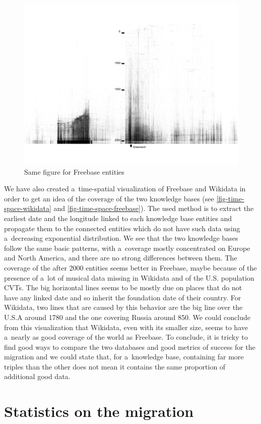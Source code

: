 \documentclass{sig-alternate}
\begin{document}
\begin{figure}
\centering
\includegraphics[width=8.45 cm]{img/freebase-time-space.png}
\caption{Same figure for Freebase entities}
\label{fig-time-space-freebase}
\end{figure}

We have also created a~time-spatial visualization of Freebase and Wikidata in order
to get an idea of the coverage of the two knowledge bases
(see \autoref{fig-time-space-wikidata} and \autoref{fig-time-space-freebase}).
The used method is to extract the earliest date and the longitude
linked to each knowledge base entities
and propagate them to the connected entities which do not have such data
using a~decreasing exponential distribution.
We see that the two knowledge bases follow the same basic patterns,
with a~coverage mostly concentrated on Europe and North America,
and there are no strong differences between them.
The coverage of the after 2000 entities seems better in Freebase, maybe because of
the presence of a~lot of musical data missing in Wikidata and of the U.S.
population CVTs.
The big horizontal lines seems to be mostly due on places that do not have any linked date
and so inherit the foundation date of their country.
For Wikidata, two lines that are caused by this behavior are the big line over the U.S.A around 1780
and the one covering Russia around 850.
We could conclude from this visualization that Wikidata, even with its smaller size,
seems to have a~nearly as good coverage of the world as Freebase.
To conclude, it is tricky to find good ways to compare the two databases
and good metrics of success for the migration and we could state that, for a~knowledge base,
containing far more triples than the other does not mean
it contains the same proportion of additional good data.

\section{Statistics on the migration}
\end{document}
